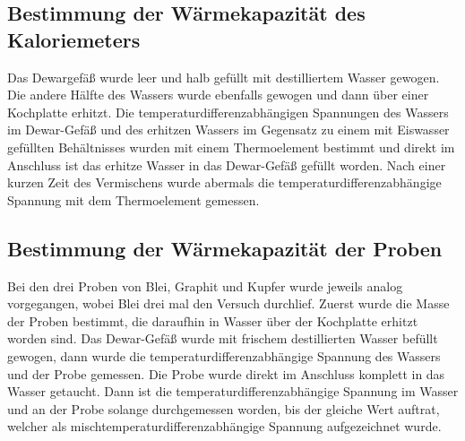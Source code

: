 \subsection{Bestimmung der Wärmekapazität des Kaloriemeters}
Das Dewargefäß wurde leer und halb gefüllt mit destilliertem Wasser gewogen. Die andere Hälfte des Wassers wurde 
ebenfalls gewogen und dann über einer Kochplatte erhitzt. Die temperaturdifferenzabhängigen Spannungen des 
Wassers im Dewar-Gefäß und des erhitzen Wassers im Gegensatz zu einem mit Eiswasser gefüllten 
Behältnisses wurden mit einem Thermoelement bestimmt und direkt im Anschluss ist das erhitze Wasser
in das Dewar-Gefäß gefüllt worden. Nach einer kurzen Zeit des Vermischens wurde abermals die 
temperaturdifferenzabhängige Spannung mit dem Thermoelement gemessen.
\subsection{Bestimmung der Wärmekapazität der Proben}  
Bei den drei Proben von Blei, Graphit und Kupfer wurde jeweils analog vorgegangen, wobei Blei drei
mal den Versuch durchlief. Zuerst wurde die Masse der Proben bestimmt, die daraufhin in Wasser über 
der Kochplatte erhitzt worden sind.
Das Dewar-Gefäß wurde mit frischem destillierten Wasser befüllt gewogen, dann wurde die 
temperaturdifferenzabhängige Spannung des Wassers und der Probe gemessen. Die Probe wurde direkt 
im Anschluss komplett in das Wasser getaucht. Dann ist die temperaturdifferenzabhängige Spannung 
im Wasser und an der Probe solange durchgemessen worden, bis der gleiche Wert auftrat, 
welcher als mischtemperaturdifferenzabhängige Spannung aufgezeichnet wurde.